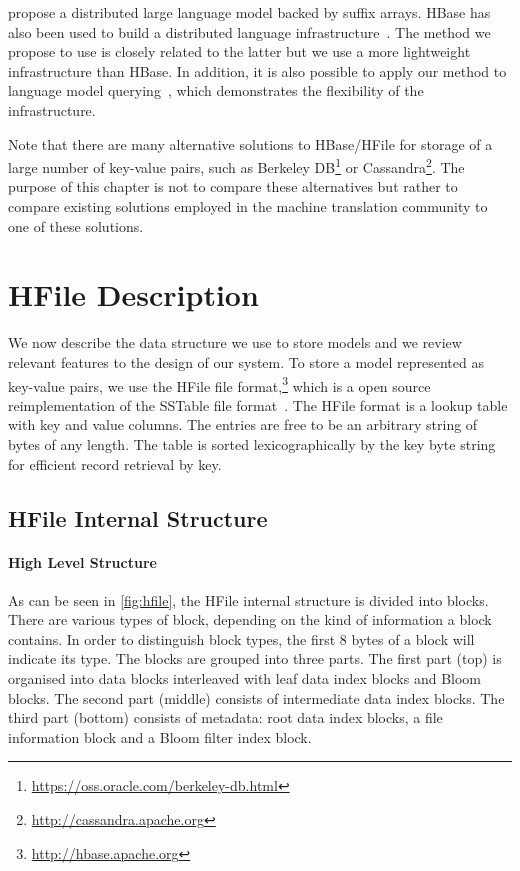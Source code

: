 \citet{zhang-hildebrand-vogel:2006:EMNLP} propose a distributed large language
model backed by suffix arrays. HBase has also been used to build a distributed
language infrastructure~\citep{yu:2008:mastersthesis}. The method we propose to
use is closely related to the latter but we use a more lightweight
infrastructure than HBase. In addition, it is also possible to apply our method
to language model querying~\citep{pino-waite-byrne:2012:PBML}, which
demonstrates the flexibility of the infrastructure.

Note that there are many alternative solutions to HBase/HFile for storage of a
large number of key-value pairs, such as Berkeley
DB\footnote{\url{https://oss.oracle.com/berkeley-db.html}} or
Cassandra\footnote{\url{http://cassandra.apache.org}}.
The purpose of this chapter
is not to compare these alternatives but rather to compare existing solutions
employed in the machine translation community to one of these solutions.

\section{HFile Description}
\label{sec:hfile}

We now describe the data structure we use to store models and we review relevant
features to the design of our system. To store a model represented as key-value
pairs, we use the HFile file format,\footnote{\url{http://hbase.apache.org}} which is
a open source reimplementation of the SSTable file
format~\citep{chang-dean-ghemawat-hsieh-wallach-burrows-chandra-fikes-gruber:2008:ACM}.
The HFile format is a lookup table with key and value columns. The entries are free
to be an arbitrary string of bytes of any length. The table is sorted
lexicographically by the key byte string for efficient record retrieval by key.

\subsection{HFile Internal Structure}


\paragraph{High Level Structure} As can be seen in \autoref{fig:hfile},
the HFile internal structure is divided into blocks. There are various types of
block, depending on the kind of information a block contains.
In order to
distinguish block types, the first 8 bytes of a
block will indicate its type. The blocks are grouped into
three parts. The first part (top) is organised into
data blocks interleaved with leaf data index blocks and Bloom blocks.
The second part (middle) consists of intermediate data index blocks.
The third part (bottom) consists of metadata: root data index blocks, a file
information block and a Bloom filter index block.

